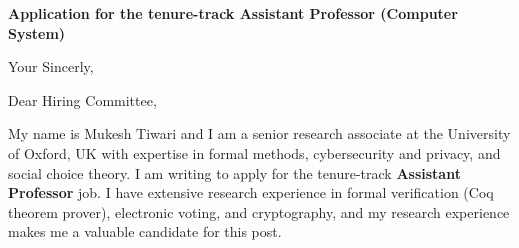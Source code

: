 \documentclass[11pt,a4paper,roman]{moderncv}
\begin{document}
\date{}
\opening{\textbf{Application for the tenure-track Assistant Professor (Computer System)}}
\closing{Your Sincerly, \vspace{-1em}}



\makelettertitle


Dear Hiring Committee, 
\\
\vspace{1em}

My name is Mukesh Tiwari and I am a senior research associate at 
the University of Oxford, UK with expertise in formal methods, cybersecurity and privacy, 
and social choice theory. I am writing to apply for the tenure-track \textbf{Assistant Professor} job.
I have extensive research experience in
formal verification (Coq theorem prover), electronic voting, and cryptography, and my research 
experience makes me a valuable candidate for this post.
\end{document}
